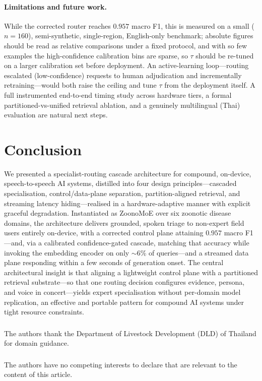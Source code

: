 \documentclass[runningheads]{llncs}
\begin{document}
\paragraph{Limitations and future work.}
While the corrected router reaches $0.957$ macro F1, this is measured on a small ($n{=}160$), semi-synthetic, single-region, English-only benchmark; absolute figures should be read as relative comparisons under a fixed protocol, and with so few examples the high-confidence calibration bins are sparse, so $\tau$ should be re-tuned on a larger calibration set before deployment. An active-learning loop---routing escalated (low-confidence) requests to human adjudication and incrementally retraining---would both raise the ceiling and tune $\tau$ from the deployment itself. A full instrumented end-to-end timing study across hardware tiers, a formal partitioned-vs-unified retrieval ablation, and a genuinely multilingual (Thai) evaluation are natural next steps.

\section{Conclusion}

We presented a specialist-routing cascade architecture for compound, on-device, speech-to-speech AI systems, distilled into four design principles---cascaded specialisation, control/data-plane separation, partition-aligned retrieval, and streaming latency hiding---realised in a hardware-adaptive manner with explicit graceful degradation. Instantiated as ZoonoMoE over six zoonotic disease domains, the architecture delivers grounded, spoken triage to non-expert field users entirely on-device, with a corrected control plane attaining $0.957$ macro F1---and, via a calibrated confidence-gated cascade, matching that accuracy while invoking the embedding encoder on only $\sim$6\% of queries---and a streamed data plane responding within a few seconds of generation onset. The central architectural insight is that aligning a lightweight control plane with a partitioned retrieval substrate---so that one routing decision configures evidence, persona, and voice in concert---yields expert specialisation without per-domain model replication, an effective and portable pattern for compound AI systems under tight resource constraints.

\begin{credits}
\subsubsection{\ackname}
The authors thank the Department of Livestock Development (DLD) of Thailand for domain guidance.

\subsubsection{\discintname}
The authors have no competing interests to declare that are relevant to the content of this article.
\end{credits}
\end{document}
